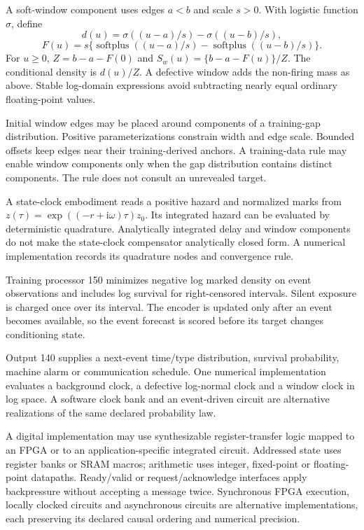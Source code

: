 \documentclass[pct]{sm-patent}
\begin{document}
\pnum A soft-window component uses edges $a<b$ and scale $s>0$. With logistic function $\sigma$, define
\[d(u)=\sigma((u-a)/s)-\sigma((u-b)/s),\]
\[F(u)=s\{\operatorname{softplus}((u-a)/s)-\operatorname{softplus}((u-b)/s)\}.
\]
For $u\geq0$, $Z=b-a-F(0)$ and $S_w(u)=\{b-a-F(u)\}/Z$. The conditional density is $d(u)/Z$. A defective window adds the non-firing mass as above. Stable log-domain expressions avoid subtracting nearly equal ordinary floating-point values.

\pnum Initial window edges may be placed around components of a training-gap distribution. Positive parameterizations constrain width and edge scale. Bounded offsets keep edges near their training-derived anchors. A training-data rule may enable window components only when the gap distribution contains distinct components. The rule does not consult an unrevealed target.

\pnum A state-clock embodiment reads a positive hazard and normalized marks from $z(\tau)=\exp((-r+\mathrm{i}\omega)\tau)z_0$. Its integrated hazard can be evaluated by deterministic quadrature. Analytically integrated delay and window components do not make the state-clock compensator analytically closed form. A numerical implementation records its quadrature nodes and convergence rule.

\pnum Training processor 150 minimizes negative log marked density on event observations and includes log survival for right-censored intervals. Silent exposure is charged once over its interval. The encoder is updated only after an event becomes available, so the event forecast is scored before its target changes conditioning state.

\pnum Output 140 supplies a next-event time/type distribution, survival probability, machine alarm or communication schedule. One numerical implementation evaluates a background clock, a defective log-normal clock and a window clock in log space. A software clock bank and an event-driven circuit are alternative realizations of the same declared probability law.


\pnum A digital implementation may use synthesizable register-transfer logic mapped to an FPGA or to an application-specific integrated circuit. Addressed state uses register banks or SRAM macros; arithmetic uses integer, fixed-point or floating-point datapaths. Ready/valid or request/acknowledge interfaces apply backpressure without accepting a message twice. Synchronous FPGA execution, locally clocked circuits and asynchronous circuits are alternative implementations, each preserving its declared causal ordering and numerical precision.
\end{document}
